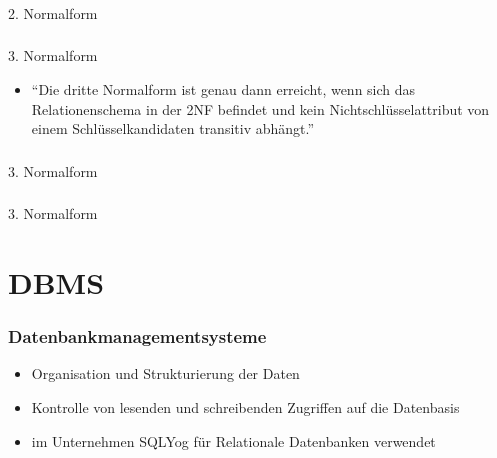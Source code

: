 \documentclass[aspectratio=169,14pt,xcolor=dvipsnames]{beamer}
\begin{document}
\begin{frame}[t]
    \frametitle{\subsecname}
    \framesubtitle{\subsubsecname}
    2. Normalform
    
\end{frame}

\begin{frame}[t]
    \frametitle{\subsecname}
    \framesubtitle{\subsubsecname}
    3. Normalform
    \begin{itemize}
        \item "`Die dritte Normalform ist genau dann erreicht, wenn sich das Relationenschema in der 2NF befindet und kein Nichtschlüsselattribut von einem Schlüsselkandidaten transitiv abhängt."'
    \end{itemize}
\end{frame}

\begin{frame}[t]
    \frametitle{\subsecname}
    \framesubtitle{\subsubsecname}
    3. Normalform
    
\end{frame}

\begin{frame}[t]
    \frametitle{\subsecname}
    \framesubtitle{\subsubsecname}
    3. Normalform
    
\end{frame}

\section{DBMS}
\begin{frame}[t]
    \frametitle{Datenbankmanagementsysteme}
    \begin{itemize}
        \item Organisation und Strukturierung der Daten
        \item Kontrolle von lesenden und schreibenden Zugriffen auf die Datenbasis
        \item im Unternehmen SQLYog für Relationale Datenbanken verwendet
    \end{itemize}
\end{frame}
\end{document}
